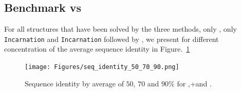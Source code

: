 \subsection{Benchmark \ourprog vs \RNASSD}


 For all structures that have been solved 
by the three methods, only \RNASSD, only \texttt{Incarnation} and
\texttt{Incarnation} followed by \RNAinverse, 
we present for different concentration of \GCContent the average sequence identity in Figure.~\ref{fig:identity_50_70_90}
\begin{figure}[ht!]
  \centering
  \texttt{[image: Figures/seq\_identity\_50\_70\_90.png]}
  \caption{Sequence identity by average \GCContent of $50$, $70$ and $90\%$ for \ourprog,\ourprog+\RNAinverse and \RNASSD.}
  \label{fig:identity_50_70_90}
\end{figure}




